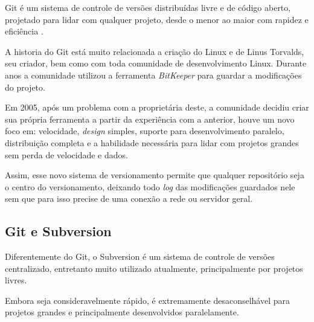 Git é um sistema de controle de versões distribuídas livre e de código aberto, projetado para lidar com qualquer projeto, desde o menor ao maior com rapidez e eficiência \cite{SOFTWARE-FREEDOM-CONSERVANCY}.

A historia do Git está muito relacionada a criação do Linux e de Linus Torvalds, seu criador, bem como com toda comunidade de desenvolvimento Linux. Durante anos a comunidade utilizou a ferramenta \textit{BitKeeper} para guardar a modificações do projeto.

Em 2005, após um problema com a proprietária deste, a comunidade decidiu criar sua própria ferramenta a partir da experiência com a anterior, houve um novo foco em: velocidade, \textit{design} simples, suporte para desenvolvimento paralelo, distribuição completa e a habilidade necessária para lidar com projetos grandes sem perda de velocidade e dados.

Assim, esse novo sistema de versionamento permite que qualquer repositório seja o centro do versionamento, deixando todo \textit{log} das modificações guardados nele sem que para isso precise de uma conexão a rede ou servidor geral.


\subsection{Git e Subversion}

Diferentemente do Git, o Subversion é um sistema de controle de versões centralizado, entretanto muito utilizado atualmente, principalmente por projetos livres.

Embora seja consideravelmente rápido, é extremamente desaconselhável para projetos grandes e principalmente desenvolvidos paralelamente.
